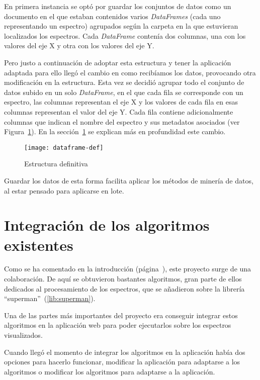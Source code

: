 En primera instancia se optó por guardar los conjuntos de datos como un
documento en el que estaban contenidos varios \textit{DataFrames} (cada uno
representando un espectro) agrupados según la carpeta en la que estuvieran
localizados los espectros. Cada \textit{DataFrame} contenía dos columnas, una
con los valores del eje X y otra con los valores del eje Y.

Pero justo a continuación de adoptar esta estructura y tener la aplicación
adaptada para ello llegó el cambio en como recibíamos los datos, provocando otra
modificación en la estructura. Esta vez se decidió agrupar todo el conjunto de
datos subido en un solo \textit{DataFrame}, en el que cada fila se corresponde
con un espectro, las columnas representan el eje X y los valores de cada fila en
esas columnas representan el valor del eje Y. Cada fila contiene adicionalmente
columnas que indican el nombre del espectro y sus metadatos asociados (ver
Figura~\ref{fig:dataframe-def}). En la sección~\ref{sec:integracion} se explican
más en profundidad este cambio.

\begin{figure}[!h]
	\centering
	\texttt{[image: dataframe-def]}
	\caption{Estructura definitiva}\label{fig:dataframe-def}
\end{figure}

Guardar los datos de esta forma facilita aplicar los métodos de minería de datos,
al estar pensado para aplicarse en lote.


\section{Integración de los algoritmos existentes}\label{sec:integracion}

Como se ha comentado en la introducción (página~\pageref{ch:introduccion}), este
proyecto surge de una colaboración. De aquí se obtuvieron bastantes algoritmos,
gran parte de ellos dedicados al procesamiento de los espectros, que se
añadieron sobre la librería ``superman''~(\ref{lib:superman}).

Una de las partes más importantes del proyecto era conseguir integrar estos
algoritmos en la aplicación web para poder ejecutarlos sobre los espectros
visualizados.

Cuando llegó el momento de integrar los algoritmos en la aplicación había dos
opciones para hacerlo funcionar, modificar la aplicación para adaptarse a los
algoritmos o modificar los algoritmos para adaptarse a la aplicación.

